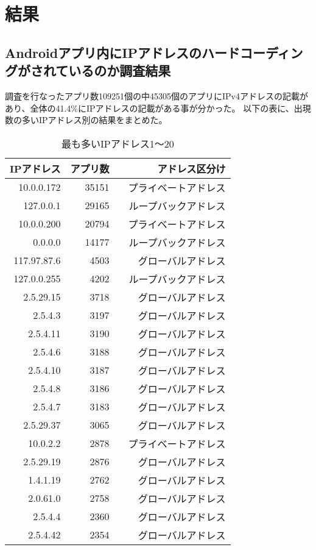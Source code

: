 \documentclass[a4j]{jarticle}
\begin{document}
\newpage
\section{結果}
\subsection{Androidアプリ内にIPアドレスのハードコーディングがされているのか調査結果}
調査を行なったアプリ数109251個の中45305個のアプリにIPv4アドレスの記載があり、全体の41.4\%にIPアドレスの記載がある事が分かった。
以下の表に、出現数の多いIPアドレス別の結果をまとめた。
\begin{table}[htb]
  \begin{center}
    \caption{最も多いIPアドレス1〜20}
    \begin{tabular}{|r|r|r|} \hline
      IPアドレス & アプリ数 & アドレス区分け\\ \hline \hline
10.0.0.172 & 35151 &プライベートアドレス\\ \hline
127.0.0.1 & 29165& ループバックアドレス\\ \hline
10.0.0.200 & 20794 & プライベートアドレス\\ \hline
0.0.0.0 & 14177 &　ループバックアドレス\\ \hline
117.97.87.6 & 4503 & グローバルアドレス\\ \hline
127.0.0.255 & 4202 & ループバックアドレス\\ \hline
2.5.29.15 & 3718 & グローバルアドレス\\ \hline
2.5.4.3 & 3197 & グローバルアドレス\\ \hline
2.5.4.11 & 3190&　グローバルアドレス \\ \hline
2.5.4.6 & 3188 & グローバルアドレス\\ \hline
2.5.4.10 & 3187 & グローバルアドレス\\ \hline
2.5.4.8 & 3186 & グローバルアドレス\\ \hline
2.5.4.7 & 3183 & グローバルアドレス\\ \hline
2.5.29.37 & 3065 & グローバルアドレス\\ \hline
10.0.2.2 & 2878 & プライベートアドレス\\ \hline
2.5.29.19 & 2876& グローバルアドレス \\ \hline
1.4.1.19 & 2762 & グローバルアドレス\\ \hline
2.0.61.0 & 2758 & グローバルアドレス\\ \hline
2.5.4.4 & 2360 & グローバルアドレス\\ \hline
2.5.4.42 & 2354 & グローバルアドレス\\ \hline

    \end{tabular}
    \label{tab:price}
  \end{center}
\end{table}
\end{document}
